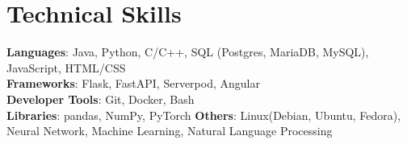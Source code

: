 \documentclass[letterpaper,11pt]{article}
\begin{document}
\section{Technical Skills}
 \begin{itemize}[leftmargin=0.15in, label={}]
    \small{\item{
     \textbf{Languages}{: Java, Python, C/C++, SQL (Postgres, MariaDB, MySQL), JavaScript, HTML/CSS} \\
     \textbf{Frameworks}{: Flask, FastAPI, Serverpod, Angular} \\
     \textbf{Developer Tools}{: Git, Docker, Bash} \\
     \textbf{Libraries}{: pandas, NumPy, PyTorch}
     \textbf{Others}{: Linux(Debian, Ubuntu, Fedora), Neural Network, Machine Learning, Natural Language Processing}
    }}
 \end{itemize}


\end{document}
